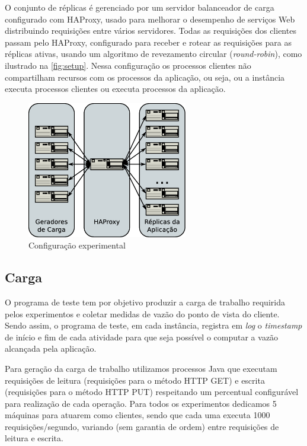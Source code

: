 O conjunto de réplicas é gerenciado por um servidor balanceador de carga configurado com
HAProxy, usado para melhorar o desempenho de serviços Web distribuindo requisições entre
vários servidores. Todas as requisições dos clientes passam pelo HAProxy, configurado para
receber e rotear as requisições para as réplicas ativas, usando um algoritmo de
revezamento circular (\emph{round-robin}), como ilustrado na \autoref{fig:setup}. Nessa
configuração os processos clientes não compartilham recursos com os processos da
aplicação, ou seja, ou a instância executa processos clientes ou executa processos da
aplicação.

\begin{figure}[ht]
  \centering
  \includegraphics[width=7cm]{conteudo/capitulos/figuras/experimental-setup.dia.eps}
  \caption{Configuração experimental}
  \label{fig:setup}
\end{figure}

\subsection{Carga}\label{subsec:carga}

O programa de teste tem por objetivo produzir a carga de trabalho requirida pelos
experimentos e coletar medidas de vazão do ponto de vista do cliente. Sendo assim, o
programa de teste, em cada instância, registra em \emph{log} o \emph{timestamp} de início
e fim de cada atividade para que seja possível o computar a vazão alcançada pela
aplicação.

Para geração da carga de trabalho utilizamos processos Java que executam requisições de
leitura (requisições para o método HTTP GET) e escrita (requisições para o método HTTP
PUT) respeitando um percentual configurável para realização de cada operação. Para todos
os experimentos dedicamos 5 máquinas para atuarem como clientes, sendo que cada uma
executa 1000 requisições/segundo, variando (sem garantia de ordem) entre requisições de
leitura e escrita.

